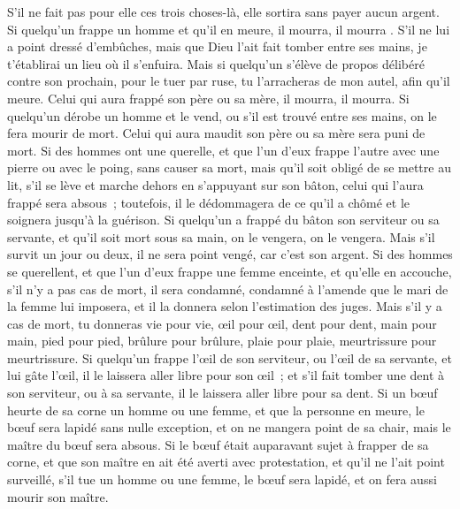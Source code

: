 \begin{multicols}{2}
S'il ne fait pas pour elle ces trois choses-là, elle sortira sans payer aucun argent.
Si quelqu'un frappe un homme et qu'il en meure, il mourra, il mourra .
S'il ne lui a point dressé d'embûches, mais que Dieu l'ait fait tomber entre ses mains, je t'établirai un lieu où il s'enfuira.
Mais si quelqu'un s'élève de propos délibéré contre son prochain, pour le tuer par ruse, tu l'arracheras de mon autel, afin qu'il meure.
Celui qui aura frappé son père ou sa mère, il mourra, il mourra.
Si quelqu'un dérobe un homme et le vend, ou s'il est trouvé entre ses mains, on le fera mourir de mort.
Celui qui aura maudit son père ou sa mère sera puni de mort.
Si des hommes ont une querelle, et que l'un d'eux frappe l'autre avec une pierre ou avec le poing, sans causer sa mort, mais qu'il soit obligé de se mettre au lit,
s'il se lève et marche dehors en s'appuyant sur son bâton, celui qui l'aura frappé sera absous~; toutefois, il le dédommagera de ce qu'il a chômé et le soignera jusqu'à la guérison.
Si quelqu'un a frappé du bâton son serviteur ou sa servante, et qu'il soit mort sous sa main, on le vengera, on le vengera.
Mais s'il survit un jour ou deux, il ne sera point vengé, car c'est son argent.
Si des hommes se querellent, et que l'un d'eux frappe une femme enceinte, et qu'elle en accouche, s'il n'y a pas cas de mort, il sera condamné, condamné à l'amende que le mari de la femme lui imposera, et il la donnera selon l'estimation des juges.
Mais s'il y a cas de mort, tu donneras vie pour vie,
œil pour œil, dent pour dent, main pour main, pied pour pied,
brûlure pour brûlure, plaie pour plaie, meurtrissure pour meurtrissure.
Si quelqu'un frappe l'œil de son serviteur, ou l'œil de sa servante, et lui gâte l'œil, il le laissera aller libre pour son œil~;
et s'il fait tomber une dent à son serviteur, ou à sa servante, il le laissera aller libre pour sa dent.
Si un bœuf heurte de sa corne un homme ou une femme, et que la personne en meure, le bœuf sera lapidé sans nulle exception, et on ne mangera point de sa chair, mais le maître du bœuf sera absous.
Si le bœuf était auparavant sujet à frapper de sa corne, et que son maître en ait été averti avec protestation, et qu'il ne l'ait point surveillé, s'il tue un homme ou une femme, le bœuf sera lapidé, et on fera aussi mourir son maître.

\end{multicols}
